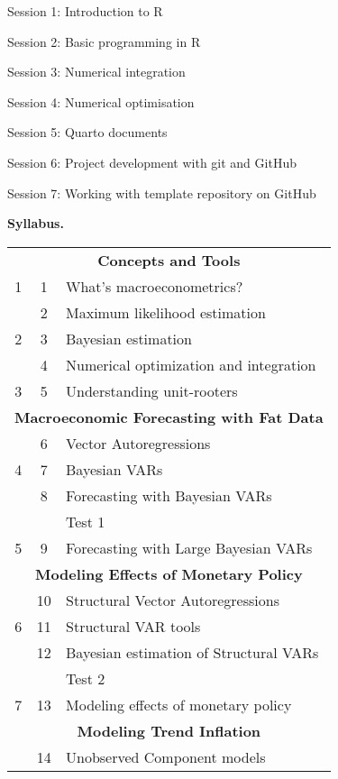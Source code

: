 \documentclass[10pt]{article}
\begin{document}
\begin{multicols}{2}
\smallskip\noindent Session 1: Introduction to R

\smallskip\noindent Session 2: Basic programming in R

\smallskip\noindent Session 3: Numerical integration

\smallskip\noindent Session 4: Numerical optimisation

\smallskip\noindent Session 5: Quarto documents

\smallskip\noindent Session 6: Project development with git and GitHub

\smallskip\noindent Session 7: Working with template repository on GitHub


\vfill\null
\columnbreak

\noindent\textbf{Syllabus.}
\begin{center}
\begin{tabular}{c c l}
\toprule 
\multicolumn{3}{c}{\textbf{Concepts and Tools}}\\
1 & 1  & What's macroeconometrics? \\
   & 2  & Maximum likelihood estimation  \\
2 & 3  & Bayesian estimation \\
   & 4  & Numerical optimization and integration \\
3 & 5  & Understanding unit-rooters \\[1ex]
\multicolumn{3}{c}{\textbf{Macroeconomic Forecasting with Fat Data}}\\
   & 6  & Vector Autoregressions \\
4 & 7  & Bayesian VARs \\
   & 8  & Forecasting with Bayesian VARs \\
   &    & Test 1 \\
5 & 9  & Forecasting with Large Bayesian VARs \\[1ex]
\multicolumn{3}{c}{\textbf{Modeling Effects of Monetary Policy}}\\
   & 10  & Structural Vector Autoregressions \\
6 & 11  & Structural VAR tools \\
   & 12  & Bayesian estimation of Structural VARs \\
   &    & Test 2 \\
7 & 13  & Modeling effects of monetary policy \\[1ex]
\multicolumn{3}{c}{\textbf{Modeling Trend Inflation}}\\
   & 14  & Unobserved Component models \\

\end{tabular}
\end{center}
\end{multicols}
\end{document}
